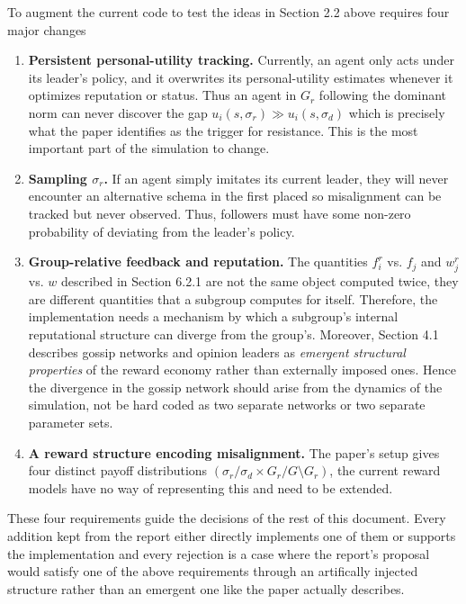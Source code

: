 \documentclass[12pt]{article}
\begin{document}
To augment the current code to test the ideas in Section 2.2 above requires four major changes
\begin{enumerate}
    \item[1.] \textbf{Persistent personal-utility tracking.} Currently, an agent only acts under its leader's policy,
    and it overwrites its personal-utility estimates whenever it optimizes reputation or status. Thus an agent in $G_r$
    following the dominant norm can never discover the gap $u_i(s, \sigma_r) \gg u_i(s, \sigma_d)$ which is precisely
    what the paper identifies as the trigger for resistance. This is the most important part of the simulation to change.
    \item[2.] \textbf{Sampling $\sigma_r$.} If an agent simply imitates its current leader,
    they will never encounter an alternative schema in the first placed so misalignment can be tracked
    but never observed. Thus, followers must have some non-zero probability of deviating from the leader's policy.
    \item[3.] \textbf{Group-relative feedback and reputation.} The quantities $f^r_i$ vs. $f_j$ and $w^r_j$ vs. $w$
    described in Section 6.2.1 are not the same object computed twice, they are different quantities that a subgroup
    computes for itself. Therefore, the implementation needs a mechanism by which a subgroup's internal reputational
    structure can diverge from the group's. Moreover, Section 4.1 describes gossip networks and opinion leaders
    as \textit{emergent structural properties} of the reward economy rather than externally imposed ones. Hence the divergence
    in the gossip network should arise from the dynamics of the simulation, not be hard coded as two separate networks
    or two separate parameter sets.
    \item[4.] \textbf{A reward structure encoding misalignment.} The paper's setup gives four
    distinct payoff distributions $(\sigma_r/\sigma_d \times G_r / G \setminus G_r)$, the current reward models
    have no way of representing this and need to be extended.
\end{enumerate}

These four requirements guide the decisions of the rest of this document. Every addition
kept from the report either directly implements one of them or supports the implementation and every rejection is
a case where the report's proposal would satisfy one of the above requirements through an artifically injected structure
rather than an emergent one like the paper actually describes.
\end{document}
